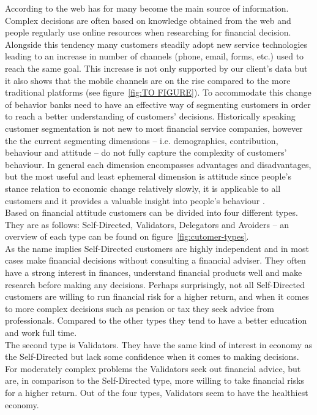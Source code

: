 According to \cite{ensor2006segmenting} the web has for many become the main source of information. Complex decisions are often based on knowledge obtained from the web and people regularly use online resources when researching for financial decision. Alongside this tendency many customers steadily adopt new service technologies leading to an increase in number of channels (phone, email, forms, etc.) used to reach the same goal. This increase is not only supported by our client’s data but it also shows that the mobile channels are on the rise compared to the more traditional platforms (see figure~\ref{fig:TO FIGURE}). To accommodate this change of behavior banks need to have an effective way of segmenting customers in order to reach a better understanding of customers’ decisions. Historically speaking customer segmentation is not new to most financial service companies, however the the current segmenting dimensions -- i.e. demographics, contribution, behaviour and attitude -- do not fully capture the complexity of customers’ behaviour. In general each dimension encompasses advantages and disadvantages, but the most useful and least ephemeral dimension is attitude since people's stance relation to economic change relatively slowly, it is applicable to all customers and it provides a valuable insight into people’s behaviour \cite[p.~2-8]{ensor2006segmenting}.\\
Based on financial attitude customers can be divided into four different types. They are as follows: Self-Directed, Validators, Delegators and Avoiders – an overview of each type can be found on figure~\ref{fig:cutomer-types}.\\
As the name implies Self-Directed customers are highly independent and in most cases make financial decisions without consulting a financial adviser. They often have a strong interest in finances, understand financial products well and make research before making any decisions. Perhaps surprisingly, not all Self-Directed customers are willing to run financial risk for a higher return, and when it comes to more complex decisions such as pension or tax they seek advice from professionals. Compared to the other types they tend to have a better education and work full time.\\
The second type is Validators. They have the same kind of interest in economy as the Self-Directed but lack some confidence when it comes to making decisions. For moderately complex problems the Validators seek out financial advice, but are, in comparison to the Self-Directed type, more willing to take financial risks for a higher return. Out of the four types, Validators seem to have the healthiest economy.
